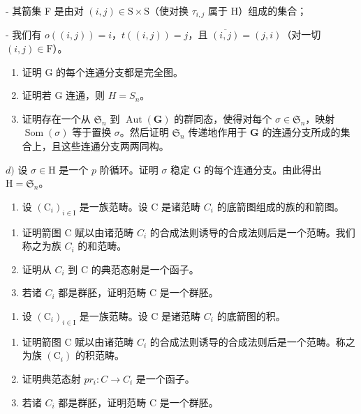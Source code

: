 - 其箭集 F 是由对 \((i,j)\in\mathrm{S}\times\mathrm{S}\)（使对换 \(\tau_{i,j}\) 属于 H）组成的集合；

- 我们有 \(o((i,j)) = i\)，\(t((i,j)) = j\)，且 \(\overline{(i,j)} = (j,i)\)（对一切 \((i,j) \in \mathrm{F}\)）。

\begin{enumerate}
\def\labelenumi{\alph{enumi})}
\item
  证明 G 的每个连通分支都是完全图。
\item
  证明若 G 连通，则 \(H = S_{n}\)。
\item
  证明存在一个从 \(\mathfrak{S}_n\) 到 \(\operatorname{Aut}(\mathbf{G})\) 的群同态，使得对每个 \(\sigma \in \mathfrak{S}_n\)，映射 \(\operatorname{Som}(\sigma)\) 等于置换 \(\sigma\)。然后证明 \(\mathfrak{S}_n\) 传递地作用于 \(\mathbf{G}\) 的连通分支所成的集合上，且这些连通分支两两同构。
\end{enumerate}

\(d)\) 设 \(\sigma\in\mathrm{H}\) 是一个 \(p\) 阶循环。证明 \(\sigma\) 稳定 G 的每个连通分支。由此得出 \(\mathrm{H}=\mathfrak{S}_{n}\)。

\exercisegroup

\begin{enumerate}
\def\labelenumi{\arabic{enumi})}
\tightlist
\item
  设 \((\mathrm{C}_{i})_{i\in\mathrm{I}}\) 是一族范畴。设 C 是诸范畴 \(C_{i}\) 的底箭图组成的族的和箭图。
\end{enumerate}

\begin{enumerate}
\def\labelenumi{\alph{enumi})}
\item
  证明箭图 C 赋以由诸范畴 \(C_{i}\) 的合成法则诱导的合成法则后是一个范畴。我们称之为族 \(C_{i}\) 的和范畴。
\item
  证明从 \(C_{i}\) 到 C 的典范态射是一个函子。
\item
  若诸 \(C_{i}\) 都是群胚，证明范畴 C 是一个群胚。
\end{enumerate}

\begin{enumerate}
\def\labelenumi{\arabic{enumi})}
\setcounter{enumi}{1}
\tightlist
\item
  设 \((\mathrm{C}_{i})_{i\in\mathrm{I}}\) 是一族范畴。设 C 是诸范畴 \(C_{i}\) 的底箭图的积。
\end{enumerate}

\begin{enumerate}
\def\labelenumi{\alph{enumi})}
\item
  证明箭图 C 赋以由诸范畴 \(C_{i}\) 的合成法则诱导的合成法则后是一个范畴。称之为族 \((\mathrm{C}_{i})\) 的积范畴。
\item
  证明典范态射 \(pr_{i}: C \rightarrow C_{i}\) 是一个函子。
\item
  若诸 \(C_{i}\) 都是群胚，证明范畴 C 是一个群胚。
\end{enumerate}

